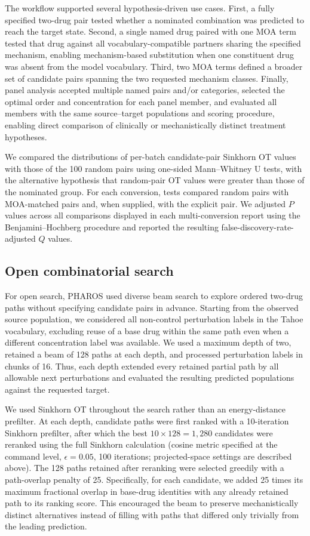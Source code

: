 \documentclass[11pt,a4paper]{article}
\begin{document}
The workflow supported several hypothesis-driven use cases. First, a fully specified two-drug pair tested whether a nominated combination was predicted to reach the target state. Second, a single named drug paired with one MOA term tested that drug against all vocabulary-compatible partners sharing the specified mechanism, enabling mechanism-based substitution when one constituent drug was absent from the model vocabulary. Third, two MOA terms defined a broader set of candidate pairs spanning the two requested mechanism classes. Finally, panel analysis accepted multiple named pairs and/or categories, selected the optimal order and concentration for each panel member, and evaluated all members with the same source--target populations and scoring procedure, enabling direct comparison of clinically or mechanistically distinct treatment hypotheses.

We compared the distributions of per-batch candidate-pair Sinkhorn OT values with those of the 100 random pairs using one-sided Mann--Whitney U tests, with the alternative hypothesis that random-pair OT values were greater than those of the nominated group. For each conversion, tests compared random pairs with MOA-matched pairs and, when supplied, with the explicit pair. We adjusted $P$ values across all comparisons displayed in each multi-conversion report using the Benjamini--Hochberg procedure and reported the resulting false-discovery-rate-adjusted $Q$ values.

\subsection{Open combinatorial search}
For open search, PHAROS used diverse beam search to explore ordered two-drug paths without specifying candidate pairs in advance. Starting from the observed source population, we considered all non-control perturbation labels in the Tahoe vocabulary, excluding reuse of a base drug within the same path even when a different concentration label was available. We used a maximum depth of two, retained a beam of 128 paths at each depth, and processed perturbation labels in chunks of 16. Thus, each depth extended every retained partial path by all allowable next perturbations and evaluated the resulting predicted populations against the requested target.

We used Sinkhorn OT throughout the search rather than an energy-distance prefilter. At each depth, candidate paths were first ranked with a 10-iteration Sinkhorn prefilter, after which the best $10 \times 128=1{,}280$ candidates were reranked using the full Sinkhorn calculation (cosine metric specified at the command level, $\epsilon=0.05$, 100 iterations; projected-space settings are described above). The 128 paths retained after reranking were selected greedily with a path-overlap penalty of 25. Specifically, for each candidate, we added 25 times its maximum fractional overlap in base-drug identities with any already retained path to its ranking score. This encouraged the beam to preserve mechanistically distinct alternatives instead of filling with paths that differed only trivially from the leading prediction.
\end{document}
